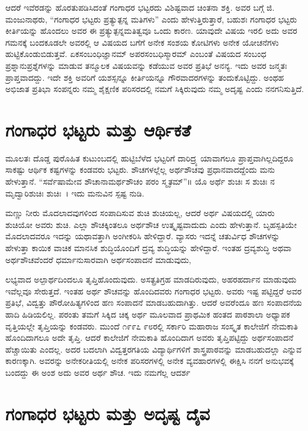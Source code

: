 {ಆದರೆ ಇವೆರಡನ್ನು ಹೊರತುಪಡಿಸಿದಂತೆ ಗಂಗಾಧರ ಭಟ್ಟರದು ವಿಶಿಷ್ಟವಾದ ಚಿಂತನಾ ಶಕ್ತಿ. ಅವರ ಬಗ್ಗೆ ಜಿ. ಮಂಜುನಾಥರು, “ಗಂಗಾಧರ ಭಟ್ಟರು ಪ್ರತ್ಯುತ್ಪನ್ನ ಮತಿಗಳು” ಎಂದು ಹೇಳುತ್ತಿರುತ್ತಾರೆ, ಬಹುಶಃ ಗಂಗಾಧರ ಭಟ್ಟರು ಕೀರ್ತಿಯನ್ನು ಹೊಂದಲು ಅವರ ಈ ಪ್ರತ್ಯುತ್ಪನ್ನಮತಿತ್ವವೂ ಒಂದು ಕಾರಣ. ಯಾವುದೇ ವಿಷಯ ಇರಲಿ ಅದು ಅವರ ಗಮನಕ್ಕೆ ಬಂದಕೂಡಲೇ ಅವರಲ್ಲಿ ಆ ವಿಷಯದ ಬಗೆಗೆ ಅನೇಕ ಸಂಶಯ ಕೋಟಿಗಳು ಅನೇಕ ಯೋಚನೆಗಳು ಹುಟ್ಟಿಕೊಂಡುಬಿಡುತ್ತವೆ. ಏಕಸಂಬಂಧಿಜ್ಞಾನಮ್ ಅಪರಸಂಬಧಿಸ್ಮಾರಮ್ ಎಂಬಂತೆ ವಿಷಯದ ಸಂಬಂಧ ಪ್ರಶ್ನಾನುಪ್ರಶ್ನೆಗಳನ್ನು ಮಾಡುವ ತನ್ಮೂಲಕ ವಿಷಯವನ್ನು ಕಡೆಯುವ ಅವರ ಪ್ರತಿಭೆ ಅನನ್ಯ. ಇದು ಅವರ ಜನ್ಮತಃ ಪ್ರಾಪ್ತವಾದದ್ದು. ಇದೇ ಶಕ್ತಿ ಅವರಿಗೆ ಯಶಸ್ಸನ್ನೂ ಕೀರ್ತಿಯನ್ನೂ ಗೌರವಾದರಗಳನ್ನು ತಂದುಕೊಟ್ಟಿದ್ದು. ಅಂಥಹ ಅಭಿಜಾತ ಪ್ರತಿಭಾ ಸಂಪನ್ನರು ನಮ್ಮ ಶೈಕ್ಷಣಿಕ ಪರಿಸರದಲ್ಲಿ ನಮಗೆ ಸಿಕ್ಕಿರುವುದು ನಮ್ಮ ಅದೃಷ್ಟ ಎಂದು ನನಗನಿಸುತ್ತಿದೆ.

\section*{ಗಂಗಾಧರ ಭಟ್ಟರು ಮತ್ತು ಆರ್ಥಿಕತೆ}

ಮೂಲತಃ ದೊಡ್ಡ ಪುರೊಹಿತ ಕುಟುಂಬದಲ್ಲಿ ಹುಟ್ಟಿಬೆಳೆದ ಭಟ್ಟರಿಗೆ ದಾರಿದ್ರ್ಯ ಯಾವಾಗಲೂ ಪ್ರಾಪ್ತವಾಗಿಲ್ಲದಿದ್ದರೂ ಸಾಕಷ್ಟು ಆರ್ಥಿಕ ಕಷ್ಟಗಳನ್ನು ಕಂಡವರು ಭಟ್ಟರು. ಶೌಚಗಳಲ್ಲೆಲ್ಲ ಅರ್ಥಶೌಚವು ಪ್ರಧಾನವಾದದ್ದೆಂದು ಮನು ಹೇಳುತ್ತಾನೆ. “ಸರ್ವೆಷಾಮೇವ ಶೌಚಾನಾಮರ್ಥಶೌಚಂ ಪರಂ ಸ್ಮೃತಮ್”॥ ಯೊ ಅರ್ಥೆ ಶುಚಿಃ ಸ ಶುಚಿಃ ನ ಮೃದ್ವಾರಿಶುಚಿಃ ಶುಚಿಃ~। ಇದು ಮನುವಿನ ಸ್ಪಷ್ಟ ನುಡಿ. 

ಮಣ್ಣು ನೀರು ಮೊದಲಾದವುಗಳಿಂದ ಸಂಪಾದಿಸುವ ಶುಚಿ ಶುಚಿಯಲ್ಲ, ಆದರೆ ಅರ್ಥ ವಿಷಯದಲ್ಲಿ ಯಾರು ಶುಚಿಯೋ ಅವರು ಶುಚಿ. ಎಲ್ಲಾ ಶೌಚಕ್ಕಿಂತಲೂ ಅರ್ಥಶೌಚ ಉತ್ಕೃಷ್ಟವಾದುದು ಎಂದು ಹೇಳುತ್ತಾನೆ. ಬೃಹಸ್ಪತಿಯೇ ಮೊದಲಾದವರೂ ಇದನ್ನು ಯಥಾವತ್ತಾಗಿ ಅಂಗೀಕರಿಸಿ ಹೇಳಿದ್ದಾರೆ. ವ್ಯಾಸರು ಇದನ್ನೆ ಚತುರ್ವಿಧ ಶೌಚಗಳನ್ನು ಹೇಳುತ್ತಾ ಕಾಯಿಕ ವಾಚಿಕ ಮಾನಸಿಕ ಶುದ್ಧಿಯೊಂದಿಗೆ ದ್ರವ್ಯ ಶುದ್ಧಿಯನ್ನು ಹೇಳಿದ್ದಾರೆ. ಇಂತಹ ದ್ರವ್ಯಶುದ್ಧಿ ಅಥವಾ ಅರ್ಥಶೌಚವೆಂದರೆ ಧರ್ಮಾನುಸಾರವಾಗಿ ಅರ್ಥಸಂಪಾದನೆ ಮಾಡುವುದು,

ಲಭ್ಯವಾದ ಅಲ್ಪಾರ್ಥದಿಂದಲೂ ತೃಪ್ತಿಹೊಂದುವುದು. ಅಸತ್ಪ್ರತಿಗ್ರಹ ಮಾಡದಿರುವುದು, ಅಹರಹರ್ದಾನ ಮಾಡುವುದು ಇವೆಲ್ಲವೂ ಸೇರುತ್ತದೆ. ಇಂತಹ ಅರ್ಥ ಶೌಚವನ್ನು ಹೊಂದಿದವರು ಗಂಗಾಧರ ಭಟ್ಟರು. ಅವರು ಇಷ್ಟ ಪಟ್ಟಿದ್ದರೆ ಅವರ ಪ್ರತಿಭೆ, ವಿದ್ವತ್ತು ಪೌರೋಹಿತ್ಯಗಳಿಂದ ಹಣ ಸಂಪಾದನೆ ಮಾಡಬಹುದಾಗಿತ್ತು. ಆದರೆ ಅವರೆಂದೂ ಹಣ ಸಂಪಾದನೆಯ ಹಾದಿ ಹಿಡಿಯಲಿಲ್ಲ. ಪರಂತು ತಮಗೆ ಸಿಕ್ಕಿದ ಚಿಕ್ಕ ಅರ್ಥ ಮೂಲವಾದ ಪ್ರಾಥಮಿಕ ಹಂತದ ಪಾಠಶಾಲಾ ಅಧ್ಯಾಪಕ ವೃತ್ತಿಯಲ್ಲೇ ತೃಪ್ತಿಯನ್ನು ಕಂಡವರು. ಮುಂದೆ ೧೯೯೭  \enginline{-}  ೯೮ರಲ್ಲಿ ಸರ್ಕಾರಿ ಮಹಾರಾಜ ಸಂಸ್ಕೃತ ಕಾಲೇಜಿಗೆ ನೇಮಕಾತಿ ಹೊಂದಿದಾಗಲೂ ಅದೇ ತೃಪ್ತಿ. ಆದರೆ ಕಾಲೇಜಿಗೆ ನೇಮಕಾತಿ ಹೊಂದಿದಾಗ ಅವರು ತೃಪ್ತಿಪಟ್ಟಿದ್ದು ಅರ್ಥಸಂಪಾದನೆ ಹೆಚ್ಚಾಯಿತು ಎಂದಲ್ಲ. ಅದರ ಬದಲಾಗಿ ವಿದ್ವತ್ತರಗತಿಯ ವಿದ್ಯಾರ್ಥಿಗಳಿಗೆ ಶಾಸ್ತ್ರಪಾಠವನ್ನು ಮಾಡಬಹುದಲ್ಲಾ ಎನ್ನುವ ಕಾರಣಕ್ಕಾಗಿ. ಅವರನ್ನು ಅನೇಕರೀತಿಯಲ್ಲಿ ಅನೇಕ ಪರಿಸರಗಳಲ್ಲಿ ಅನೇಕ ವ್ಯವಹಾರಗಳಲ್ಲಿ ಈಕ್ಷಿಸಿ ನನಗೆ ಅನುಭವಕ್ಕೆ ಬಂದದ್ದು ಈ ಅಂಶ   \enginline{-}   ಅದು ಅವರ ಅರ್ಥ ಶೌಚ. ಇದು ನಮಗೆಲ್ಲ ಆದರ್ಶ 

\section*{ಗಂಗಾಧರ ಭಟ್ಟರು ಮತ್ತು ಅದೃಷ್ಟ   \enginline{-}   ದೈವ}

}
